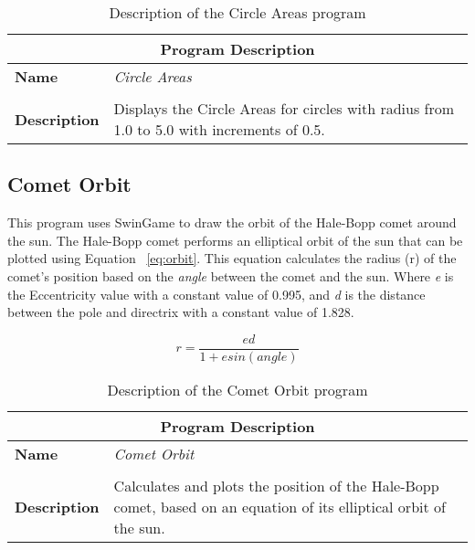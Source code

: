\begin{table}[h]
\centering
\begin{tabular}{l|p{10cm}}
  \hline
  \multicolumn{2}{c}{\textbf{Program Description}} \\
  \hline
  \textbf{Name} & \emph{Circle Areas} \\
  \\
  \textbf{Description} & Displays the Circle Areas for circles with radius from 1.0 to 5.0 with increments of 0.5. \\
  \hline
\end{tabular}
\caption{Description of the Circle Areas program}
\label{tbl:data-circle-area}
\end{table}




\clearpage




\clearpage
\subsection{Comet Orbit} %
\label{sub:comet_orbit}

This program uses SwinGame to draw the orbit of the Hale-Bopp comet around the sun. The Hale-Bopp comet performs an elliptical orbit of the sun that can be plotted using Equation~ \ref{eq:orbit}. This equation calculates the radius (r) of the comet's position based on the \emph{angle} between the comet and the sun. Where \emph{e} is the Eccentricity value with a constant value of 0.995, and \emph{d} is the distance between the pole and directrix with a constant value of 1.828.

\begin{equation}
  r = \frac{ed}{1 + e sin(angle)}
  \label{eq:orbit}
\end{equation}

\begin{table}[h]
\centering
\begin{tabular}{l|p{10cm}}
  \hline
  \multicolumn{2}{c}{\textbf{Program Description}} \\
  \hline
  \textbf{Name} & \emph{Comet Orbit} \\
  \\
  \textbf{Description} & Calculates and plots the position of the Hale-Bopp comet, based on an equation of its elliptical orbit of the sun. \\
  \hline
\end{tabular}
\caption{Description of the Comet Orbit program}
\label{tbl:data-comet-orbit}
\end{table}

